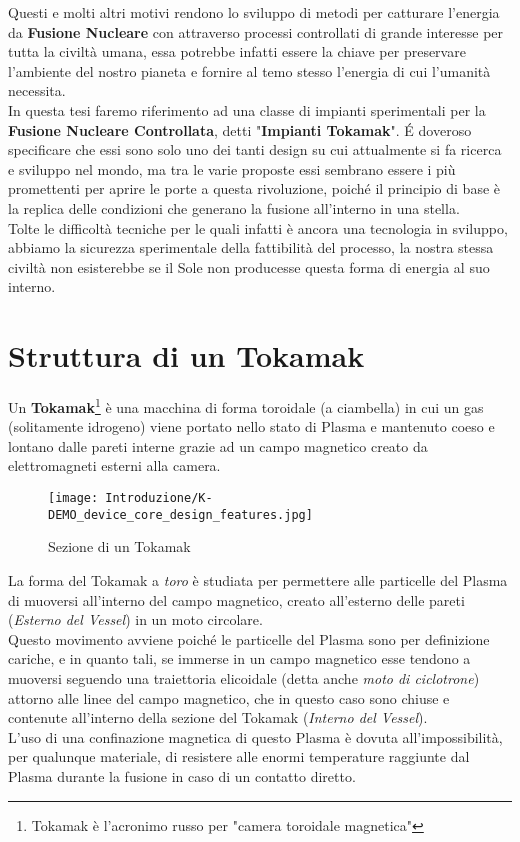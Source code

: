 \noindent
Questi e molti altri motivi rendono lo sviluppo di metodi per catturare l'energia da \textbf{Fusione Nucleare} con attraverso processi controllati di grande interesse per tutta la civiltà umana, essa potrebbe infatti essere la chiave per preservare l'ambiente del nostro pianeta e fornire al temo stesso l'energia di cui l'umanità necessita.\\
In questa tesi faremo riferimento ad una classe di impianti sperimentali per la \textbf{Fusione Nucleare Controllata}, detti "\textbf{Impianti Tokamak}". \'E doveroso specificare che essi sono solo uno dei tanti design su cui attualmente si fa ricerca e sviluppo nel mondo, ma tra le varie proposte essi sembrano essere i più promettenti per aprire le porte a questa rivoluzione, poiché il principio di base è la replica delle condizioni che generano la fusione all'interno in una stella.\\
Tolte le difficoltà tecniche per le quali infatti è ancora una tecnologia in sviluppo, abbiamo la sicurezza sperimentale della fattibilità del processo, la nostra stessa civiltà non esisterebbe se il Sole non producesse questa forma di energia al suo interno.
\newpage

\section*{Struttura di un Tokamak}
Un \textbf{Tokamak}\footnote{Tokamak è l'acronimo russo per "camera toroidale magnetica"} è una macchina di forma toroidale (a ciambella) in cui un gas (solitamente idrogeno) viene portato nello stato di Plasma e mantenuto coeso e lontano dalle pareti interne grazie ad un campo magnetico creato da elettromagneti esterni alla camera.
\begin{figure}[H]
	\centering
	\caption[Sezione di un Tokamak]{Sezione di un Tokamak}
	\texttt{[image: Introduzione/K-DEMO\_device\_core\_design\_features.jpg]}
\end{figure}

\noindent
La forma del Tokamak a \textit{toro} è studiata per permettere alle particelle del Plasma di muoversi all'interno del campo magnetico, creato all'esterno delle pareti (\textit{Esterno del Vessel}) in un moto circolare.\\
Questo movimento avviene poiché le particelle del Plasma sono per definizione cariche, e in quanto tali, se immerse in un campo magnetico esse tendono a muoversi seguendo una traiettoria elicoidale (detta anche \textit{moto di ciclotrone}) attorno alle linee del campo magnetico, che in questo caso sono chiuse e contenute all'interno della sezione del Tokamak (\textit{Interno del Vessel}).\\
L'uso di una confinazione magnetica di questo Plasma è dovuta all'impossibilità, per qualunque materiale, di resistere alle enormi temperature raggiunte dal Plasma durante la fusione in caso di un contatto diretto.\\

